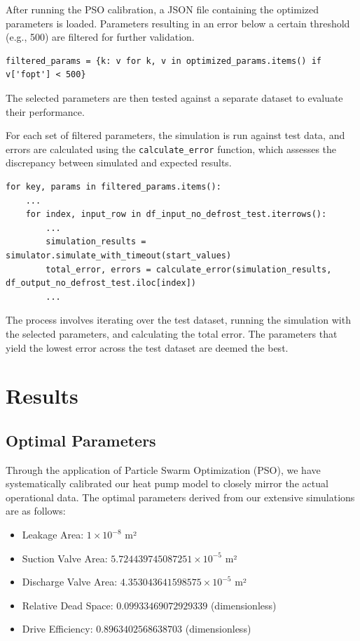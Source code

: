 \documentclass{report}
\begin{document}
After running the PSO calibration, a JSON file containing the optimized parameters is loaded. Parameters resulting in an error below a certain threshold (e.g., 500) are filtered for further validation.

\begin{lstlisting}
filtered_params = {k: v for k, v in optimized_params.items() if v['fopt'] < 500}
\end{lstlisting}

The selected parameters are then tested against a separate dataset to evaluate their performance.

For each set of filtered parameters, the simulation is run against test data, and errors are calculated using the \texttt{calculate\_error} function, which assesses the discrepancy between simulated and expected results.

\begin{lstlisting}
for key, params in filtered_params.items():
    ...
    for index, input_row in df_input_no_defrost_test.iterrows():
        ...
        simulation_results = simulator.simulate_with_timeout(start_values)
        total_error, errors = calculate_error(simulation_results, df_output_no_defrost_test.iloc[index])
        ...
\end{lstlisting}

The process involves iterating over the test dataset, running the simulation with the selected parameters, and calculating the total error. The parameters that yield the lowest error across the test dataset are deemed the best.


\section{Results}

\subsection{Optimal Parameters}
Through the application of Particle Swarm Optimization (PSO), we have systematically calibrated our heat pump model to closely mirror the actual operational data. The optimal parameters derived from our extensive simulations are as follows:

\begin{itemize}
    \item Leakage Area: \(1 \times 10^{-8}\) m²
    \item Suction Valve Area: \(5.724439745087251 \times 10^{-5}\) m²
    \item Discharge Valve Area: \(4.353043641598575 \times 10^{-5}\) m²
    \item Relative Dead Space: \(0.09933469072929339\) (dimensionless)
    \item Drive Efficiency: \(0.8963402568638703\) (dimensionless)
\end{itemize}
\end{document}
